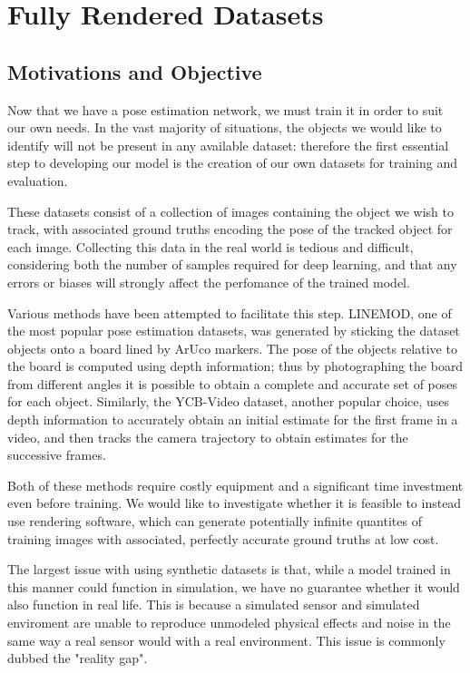 \section{Fully Rendered Datasets}

\subsection{Motivations and Objective}

Now that we have a pose estimation network, we must train it in order to suit our own needs. In the vast majority of situations, the objects we would like to identify will not be present in any available dataset: therefore the first essential step to developing our model is the creation of our own datasets for training and evaluation.

These datasets consist of a collection of images containing the object we wish to track, with associated ground truths encoding the pose of the tracked object for each image. Collecting this data in the real world is tedious and difficult, considering both the number of samples required for deep learning, and that any errors or biases will strongly affect the perfomance of the trained model.

Various methods have been attempted to facilitate this step. LINEMOD\cite{linemod}, one of the most popular pose estimation datasets, was generated by sticking the dataset objects onto a board lined by ArUco markers. The pose of the objects relative to the board is computed using depth information; thus by photographing the board from different angles it is possible to obtain a complete and accurate set of poses for each object. Similarly, the YCB-Video dataset, another popular choice, uses depth information to accurately obtain an initial estimate for the first frame in a video, and then tracks the camera trajectory to obtain estimates for the successive frames.

Both of these methods require costly equipment and a significant time investment even before training. We would like to investigate whether it is feasible to instead use rendering software, which can generate potentially infinite quantites of training images with associated, perfectly accurate ground truths at low cost.

The largest issue with using synthetic datasets is that, while a model trained in this manner could function in simulation, we have no guarantee whether it would also function in real life. This is because a simulated sensor and simulated enviroment are unable to reproduce unmodeled physical effects and noise in the same way a real sensor would with a real environment. This issue is commonly dubbed the "reality gap"\cite{domainRandomization2}.

